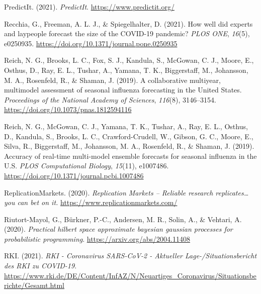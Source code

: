 \documentclass[
]{article}
\newlength{\cslhangindent}
\newlength{\cslentryspacingunit} %
\newenvironment{CSLReferences}[2] %
 {%
  \setlength{\parindent}{0pt}
  \ifodd #1
  \let\oldpar\par
  \def\par{\hangindent=\cslhangindent\oldpar}
  \fi
  \setlength{\parskip}{#2\cslentryspacingunit}
 }%
 {}
\begin{document}
\begin{CSLReferences}{1}{0}
\leavevmode{}%
PredictIt. (2021). \emph{{PredictIt}}. \url{https://www.predictit.org/}

\leavevmode{}%
Recchia, G., Freeman, A. L. J., \& Spiegelhalter, D. (2021). How well did experts and laypeople forecast the size of the {COVID}-19 pandemic? \emph{PLOS ONE}, \emph{16}(5), e0250935. \url{https://doi.org/10.1371/journal.pone.0250935}

\leavevmode{}%
Reich, N. G., Brooks, L. C., Fox, S. J., Kandula, S., McGowan, C. J., Moore, E., Osthus, D., Ray, E. L., Tushar, A., Yamana, T. K., Biggerstaff, M., Johansson, M. A., Rosenfeld, R., \& Shaman, J. (2019). A collaborative multiyear, multimodel assessment of seasonal influenza forecasting in the {United States}. \emph{Proceedings of the National Academy of Sciences}, \emph{116}(8), 3146--3154. \url{https://doi.org/10.1073/pnas.1812594116}

\leavevmode{}%
Reich, N. G., McGowan, C. J., Yamana, T. K., Tushar, A., Ray, E. L., Osthus, D., Kandula, S., Brooks, L. C., Crawford-Crudell, W., Gibson, G. C., Moore, E., Silva, R., Biggerstaff, M., Johansson, M. A., Rosenfeld, R., \& Shaman, J. (2019). Accuracy of real-time multi-model ensemble forecasts for seasonal influenza in the {U}.{S}. \emph{PLOS Computational Biology}, \emph{15}(11), e1007486. \url{https://doi.org/10.1371/journal.pcbi.1007486}

\leavevmode{}%
ReplicationMarkets. (2020). \emph{Replication {Markets} -- {Reliable} research replicates\ldots you can bet on it.} \url{https://www.replicationmarkets.com/}

\leavevmode{}%
Riutort-Mayol, G., Bürkner, P.-C., Andersen, M. R., Solin, A., \& Vehtari, A. (2020). \emph{Practical hilbert space approximate bayesian gaussian processes for probabilistic programming}. \url{https://arxiv.org/abs/2004.11408}

\leavevmode{}%
RKI. (2021). \emph{{RKI} - {Coronavirus SARS}-{CoV}-2 - {Aktueller Lage}-/{Situationsbericht} des {RKI} zu {COVID}-19}. \url{https://www.rki.de/DE/Content/InfAZ/N/Neuartiges_Coronavirus/Situationsberichte/Gesamt.html}


\end{CSLReferences}
\end{document}
